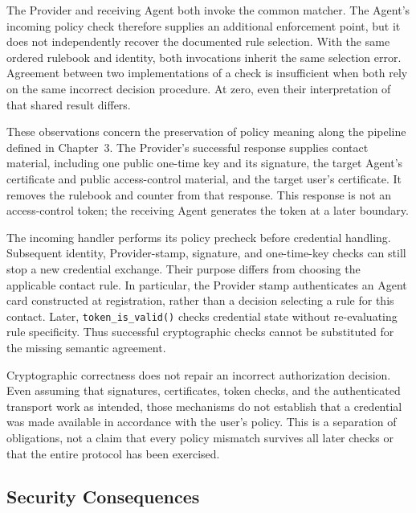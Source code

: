 The Provider and receiving Agent both invoke the common matcher. The Agent's
incoming policy check therefore supplies an additional enforcement point,
but it does not independently recover the documented rule selection. With
the same ordered rulebook and identity, both invocations inherit the same
selection error. Agreement between two implementations of a check is
insufficient when both rely on the same incorrect decision procedure.
At zero, even their interpretation of that shared result differs.

These observations concern the preservation of policy meaning along the
pipeline defined in Chapter~3. The Provider's successful response supplies
contact material, including one public one-time key and its signature, the
target Agent's certificate and public access-control material, and the target
user's certificate. It removes the rulebook and counter from that response.
This response is not an access-control token; the receiving Agent generates
the token at a later boundary.

The incoming handler performs its policy precheck before credential handling.
Subsequent identity, Provider-stamp, signature, and one-time-key checks can
still stop a new credential exchange. Their purpose differs from choosing the
applicable contact rule. In particular, the Provider stamp authenticates an
Agent card constructed at registration, rather than a decision selecting a
rule for this contact. Later, \texttt{token\_is\_valid()} checks credential
state without re-evaluating rule specificity. Thus successful cryptographic
checks cannot be substituted for the missing semantic agreement.

Cryptographic correctness does not repair an incorrect authorization
decision. Even assuming that signatures, certificates, token checks, and the
authenticated transport work as intended, those mechanisms do not establish
that a credential was made available in accordance with the user's policy.
This is a separation of obligations, not a claim that every policy mismatch
survives all later checks or that the entire protocol has been exercised.


\subsection{Security Consequences}


